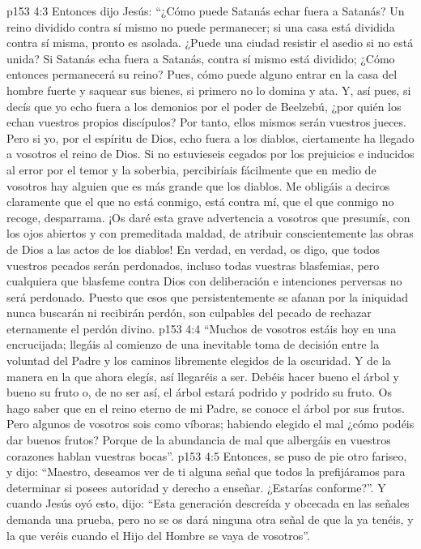 \vs p153 4:3 Entonces dijo Jesús: “¿Cómo puede Satanás echar fuera a Satanás? Un reino dividido contra sí mismo no puede permanecer; si una casa está dividida contra sí misma, pronto es asolada. ¿Puede una ciudad resistir el asedio si no está unida? Si Satanás echa fuera a Satanás, contra sí mismo está dividido; ¿Cómo entonces permanecerá su reino? Pues, cómo puede alguno entrar en la casa del hombre fuerte y saquear sus bienes, si primero no lo domina y ata. Y, así pues, si decís que yo echo fuera a los demonios por el poder de Beelzebú, ¿por quién los echan vuestros propios discípulos? Por tanto, ellos mismos serán vuestros jueces. Pero si yo, por el espíritu de Dios, echo fuera a los diablos, ciertamente ha llegado a vosotros el reino de Dios. Si no estuvieseis cegados por los prejuicios e inducidos al error por el temor y la soberbia, percibiríais fácilmente que en medio de vosotros hay alguien que es más grande que los diablos. Me obligáis a deciros claramente que el que no está conmigo, está contra mí, que el que conmigo no recoge, desparrama. ¡Os daré esta grave advertencia a vosotros que presumís, con los ojos abiertos y con premeditada maldad, de atribuir conscientemente las obras de Dios a las actos de los diablos! En verdad, en verdad, os digo, que todos vuestros pecados serán perdonados, incluso todas vuestras blasfemias, pero cualquiera que blasfeme contra Dios con deliberación e intenciones perversas no será perdonado. Puesto que esos que persistentemente se afanan por la iniquidad nunca buscarán ni recibirán perdón, son culpables del pecado de rechazar eternamente el perdón divino.
\vs p153 4:4 “Muchos de vosotros estáis hoy en una encrucijada; llegáis al comienzo de una inevitable toma de decisión entre la voluntad del Padre y los caminos libremente elegidos de la oscuridad. Y de la manera en la que ahora elegís, así llegaréis a ser. Debéis hacer bueno el árbol y bueno su fruto o, de no ser así, el árbol estará podrido y podrido su fruto. Os hago saber que en el reino eterno de mi Padre, se conoce el árbol por sus frutos. Pero algunos de vosotros sois como víboras; habiendo elegido el mal ¿cómo podéis dar buenos frutos? Porque de la abundancia de mal que albergáis en vuestros corazones hablan vuestras bocas”.
\vs p153 4:5 Entonces, se puso de pie otro fariseo, y dijo: “Maestro, deseamos ver de ti alguna señal que todos la prefijáramos para determinar si posees autoridad y derecho a enseñar. ¿Estarías conforme?”. Y cuando Jesús oyó esto, dijo: “Esta generación descreída y obcecada en las señales demanda una prueba, pero no se os dará ninguna otra señal de que la ya tenéis, y la que veréis cuando el Hijo del Hombre se vaya de vosotros”.
